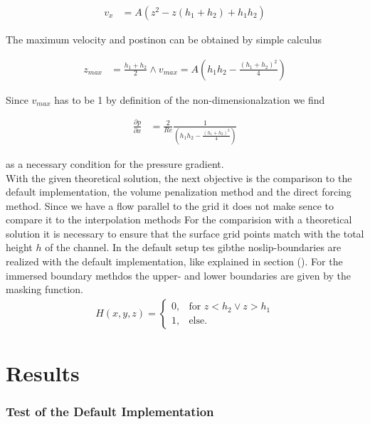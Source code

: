 \begin{align}
v_x &= A(z^2 - z(h_1 + h_2) + h_1h_2)
\end{align}

The maximum velocity and postinon can be obtained by simple calculus

\begin{align}
z_{max} &= \frac{h_1+h_2}{2} \wedge v_{max} = A\left(h_1h_2 - \frac{(h_1 + h_2)^2}{4}\right)
\end{align}

Since $v_{max}$ has to be 1 by definition of the non-dimensionalzation we find

\begin{align}
\frac{\partial p}{\partial x} &= \frac{2}{Re}\frac{1}{\left(h_1h_2 - \frac{(h_1+h_2)^2}{4} \right)}
\end{align}

as a necessary condition for the pressure gradient.\\
With the given theoretical solution, the next objective is the comparison
to the default implementation, the volume penalization method and the direct forcing method.
Since we have a flow parallel to the grid  it does not make sence to compare it to the interpolation methods
For the comparision with a theoretical solution it is necessary to ensure that
 the surface grid points match with the total height $h$ of the channel.
In the default setup tes gibthe noslip-boundaries are
realized with the default implementation, like explained in section ().
For the immersed boundary methdos the upper- and lower boundaries are given by the masking function.
\begin{align}
H(x, y, z) = \begin{cases}
                    0, & \text{for \  }  z < h_2 \lor z>h_1 \\
                    1, & \text{else}.
             \end{cases}
\end{align}


\section{Results}


\subsubsection{Test of the Default Implementation}

